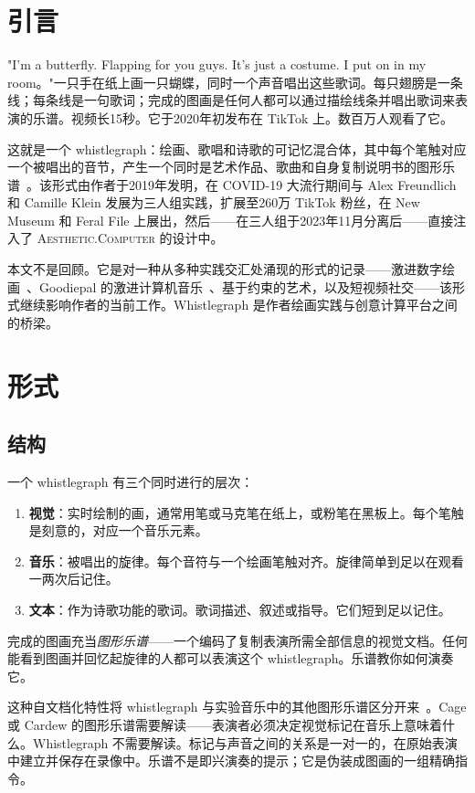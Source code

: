 \documentclass[10pt,letterpaper,twocolumn]{article}
\newcommand{\ac}{\textsc{Aesthetic.Computer}}
\begin{document}
\section{引言}

"I'm a butterfly. Flapping for you guys. It's just a costume. I put on in my room。"一只手在纸上画一只蝴蝶，同时一个声音唱出这些歌词。每只翅膀是一条线；每条线是一句歌词；完成的图画是任何人都可以通过描绘线条并唱出歌词来表演的乐谱。视频长15秒。它于2020年初发布在 TikTok 上。数百万人观看了它。

这就是一个 whistlegraph：绘画、歌唱和诗歌的可记忆混合体，其中每个笔触对应一个被唱出的音节，产生一个同时是艺术作品、歌曲和自身复制说明书的图形乐谱~\citep{dirt2023whistlegraph}。该形式由作者于2019年发明，在 COVID-19 大流行期间与 Alex Freundlich 和 Camille Klein 发展为三人组实践，扩展至260万 TikTok 粉丝，在 New Museum 和 Feral File 上展出，然后——在三人组于2023年11月分离后——直接注入了 \ac{} 的设计中。

本文不是回顾。它是对一种从多种实践交汇处涌现的形式的记录——激进数字绘画~\citep{scudder2017manifesto}、Goodiepal 的激进计算机音乐~\citep{goodiepal2012elcamino}、基于约束的艺术，以及短视频社交——该形式继续影响作者的当前工作。Whistlegraph 是作者绘画实践与创意计算平台之间的桥梁。

\section{形式}

\subsection{结构}

一个 whistlegraph 有三个同时进行的层次：

\begin{enumerate}
  \item \textbf{视觉}：实时绘制的画，通常用笔或马克笔在纸上，或粉笔在黑板上。每个笔触是刻意的，对应一个音乐元素。
  \item \textbf{音乐}：被唱出的旋律。每个音符与一个绘画笔触对齐。旋律简单到足以在观看一两次后记住。
  \item \textbf{文本}：作为诗歌功能的歌词。歌词描述、叙述或指导。它们短到足以记住。
\end{enumerate}

完成的图画充当\emph{图形乐谱}——一个编码了复制表演所需全部信息的视觉文档。任何能看到图画并回忆起旋律的人都可以表演这个 whistlegraph。乐谱教你如何演奏它。

这种自文档化特性将 whistlegraph 与实验音乐中的其他图形乐谱区分开来~\citep{magnusson2010designing}。Cage 或 Cardew 的图形乐谱需要解读——表演者必须决定视觉标记在音乐上意味着什么。Whistlegraph 不需要解读。标记与声音之间的关系是一对一的，在原始表演中建立并保存在录像中。乐谱不是即兴演奏的提示；它是伪装成图画的一组精确指令。
\end{document}
